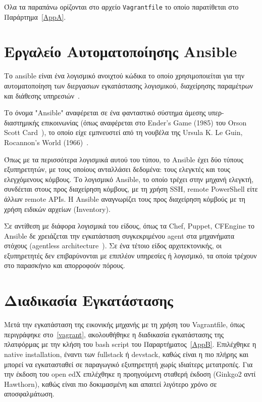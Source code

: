 \documentclass[12pt]{report}
\begin{document}
Όλα τα παραπάνω ορίζονται στο αρχείο \textlatin{\texttt{Vagrantfile}} το οποίο παρατίθεται στο Παράρτημα~\ref{AppA}.

\section{Εργαλείο Αυτοματοποίησης \textlatin{Ansible}}\label{ansible}
Το \textlatin{ansible} είναι ένα λογισμικό ανοιχτού κώδικα το οποίο χρησιμοποιείται για την αυτοματοποίηση των διεργασιων εγκατάστασης λογισμικού, διαχείρησης παραμέτρων και διάθεσης υπηρεσιών~\cite{wikipedia_2019}.

Το όνομα \textlatin{"Ansible"} αναφέρεται σε ένα φανταστικό σύστημα άμεσης υπερ-διαστημικής επικοινωνίας (όπως αναφέρεται στο \textlatin{Ender's Game} (1985) του \textlatin{Orson Scott Card}~\cite{wikipedia_2019}), το οποίο είχε εμπνευστεί από τη νουβέλα της \textlatin{Ursula K. Le Guin, Rocannon's World (1966)}~\cite{worldcat}.

Όπως με τα περισσότερα λογισμικά αυτού του τύπου, το \textlatin{Ansible} έχει δύο τύπους εξυπηρετητών, με τους οποίους ανταλλάσει δεδομένα: τους ελεγκτές και τους ελεγχόμενους κόμβους. Το λογισμικό \textlatin{Ansible}, το οποίο τρέχει στην μηχανή ελεγκτή, συνδέεται στους προς διαχείρηση κόμβους, με τη χρήση \textlatin{SSH, remote PowerShell} είτε άλλων \textlatin{remote APIs}. Η \textlatin{Ansible} αναγνωρίζει τους προς διαχείρηση κόμβούς με τη χρήση ειδικών αρχείων (\textlatin{Inventory}).

Σε αντίθεση με διάφορα λογισμικά του είδους, όπως τα \textlatin{Chef, Puppet, CFEngine} το \textlatin{Ansible} δε χρειάζεται την εγκατάσταση συγκεκριμένου \textlatin{agent} στα μηχανήματα στόχους (\textlatin{agentless architecture}~\cite{wikipedia_2019}). Σε ένα τέτοιο είδος αρχιτεκτονικής, οι εξυπηρετητές δεν επιβαρύνονται με επιπλέον υπηρεσίες ή λογισμικό, τα οποία τρέχουν στο παρασκήνιο και απορροφούν πόρους.

\section{Διαδικασία Εγκατάστασης}
Μετά την εγκατάσταση της εικονικής μηχανής με τη χρήση του \textlatin{Vagrantfile}, όπως περιγράφηκε στο~\ref{vagrant}, ακολουθήθηκε η διαδικασία εγκατάστασης της πλατφόρμας με την κλήση του \textlatin{bash script} του Παραρτήματος~\ref{AppB}. Επιλέχθηκε η \textlatin{native installation}, έναντι των \textlatin{fullstack} ή \textlatin{devstack}, καθώς είναι η πιο πλήρης και μπορεί να εγκατασταθεί σε παραγωγικό εξυπηρετητή χωρίς ιδιαίτερς μετατροπές. Για την έκδοση του \textlatin{open edX} επιλέχθηκε η προηγούμενη σταθερή έκδοση (\textlatin{Ginkgo2} αντί \textlatin{Hawthorn}), καθώς είναι πιο δοκιμασμένη και απαιτεί λιγότερο χρόνο σε αποσφαλμάτωση.
\end{document}
